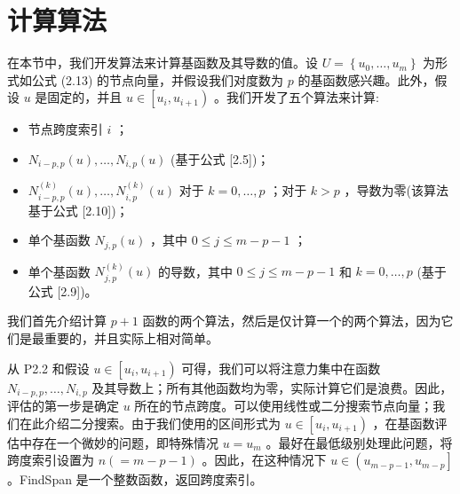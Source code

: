 \documentclass[../main.tex]{subfiles}
\begin{document}
\section{计算算法}

在本节中，我们开发算法来计算基函数及其导数的值。设 \(U = \left\{  {{u}_{0},\ldots ,{u}_{m}}\right\}\) 为形式如公式 (2.13) 的节点向量，并假设我们对度数为 \(p\) 的基函数感兴趣。此外，假设 \(u\) 是固定的，并且 \(u \in  \left\lbrack  {{u}_{i},{u}_{i + 1}}\right)\) 。我们开发了五个算法来计算:

\begin{itemize}
\item 节点跨度索引 \(i\) ；
\end{itemize}

\begin{itemize}
\item \({N}_{i - p,p}\left( u\right) ,\ldots ,{N}_{i,p}\left( u\right)\) (基于公式 [2.5])；
\end{itemize}

\begin{itemize}
\item \({N}_{i - p,p}^{\left( k\right) }\left( u\right) ,\ldots ,{N}_{i,p}^{\left( k\right) }\left( u\right)\) 对于 \(k = 0,\ldots ,p\) ；对于 \(k > p\) ，导数为零(该算法基于公式 [2.10])；
\end{itemize}

\begin{itemize}
\item 单个基函数 \({N}_{j,p}\left( u\right)\) ，其中 \(0 \leq  j \leq  m - p - 1\) ；
\end{itemize}

\begin{itemize}
\item 单个基函数 \({N}_{j,p}^{\left( k\right) }\left( u\right)\) 的导数，其中 \(0 \leq  j \leq  m - p - 1\) 和 \(k = 0,\ldots ,p\) (基于公式 [2.9])。
\end{itemize}

我们首先介绍计算 \(p + 1\) 函数的两个算法，然后是仅计算一个的两个算法，因为它们是最重要的，并且实际上相对简单。

从 P2.2 和假设 \(u \in  \left\lbrack  {{u}_{i},{u}_{i + 1}}\right)\) 可得，我们可以将注意力集中在函数 \({N}_{i - p,p},\ldots ,{N}_{i,p}\) 及其导数上；所有其他函数均为零，实际计算它们是浪费。因此，评估的第一步是确定 \(u\) 所在的节点跨度。可以使用线性或二分搜索节点向量；我们在此介绍二分搜索。由于我们使用的区间形式为 \(u \in  \left\lbrack  {{u}_{i},{u}_{i + 1}}\right)\) ，在基函数评估中存在一个微妙的问题，即特殊情况 \(u = {u}_{m}\) 。最好在最低级别处理此问题，将跨度索引设置为 \(n\left( { = m - p - 1}\right)\) 。因此，在这种情况下 \(u \in  \left( {{u}_{m - p - 1},{u}_{m - p}}\right\rbrack\) 。FindSpan 是一个整数函数，返回跨度索引。
\end{document}
